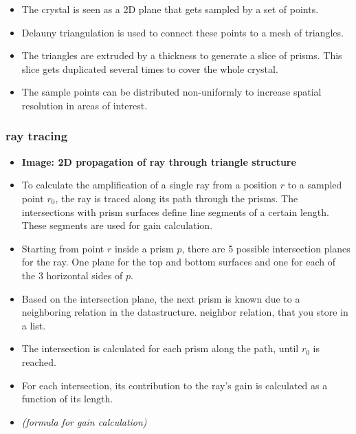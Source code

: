 \begin{itemize}
  \item The crystal is seen as a 2D plane that gets sampled by a set of
    points.\label{label:meshSampling}

  \item Delauny triangulation is used to connect these points to a mesh of
    triangles.

  \item The triangles are extruded by a thickness to generate a slice of
    prisms. This slice gets duplicated several times to cover the whole
    crystal.

  \item The sample points can be distributed non-uniformly to increase
    spatial resolution in areas of interest.

\end{itemize}



\subsubsection{ray tracing}

\begin{itemize}

  \item \textbf{Image: 2D propagation of ray through triangle structure}

  \item To calculate the amplification of a single ray from a position $r$
    to a sampled point $r_0$, the ray is traced along its path through the
    prisms. The intersections with prism surfaces define line segments of a
    certain length. These segments are used for gain calculation.

  \item Starting from point $r$ inside a prism $p$, there are 5 possible
    intersection planes for the ray. One plane for the top and bottom
    surfaces and one for each of the 3 horizontal sides of $p$.

  \item Based on the intersection plane, the next prism is known due to a
    neighboring relation in the datastructure.  neighbor relation, that you
    store in a list.

  \item The intersection is calculated for each prism along the path, until
    $r_0$ is reached.
  
  \item For each intersection, its contribution to the ray's gain is calculated
    as a function of its length.

  \item \textit{(formula for gain calculation)}

\end{itemize}



